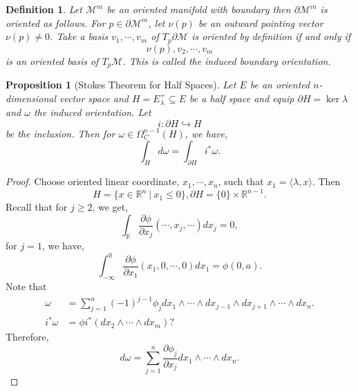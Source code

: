 \documentclass[8pt]{article}
\newtheorem{proposition}{Proposition}[section]
\newtheorem{definition}{Definition}[section]
\newcommand{\R}[0]{\mathbb{R}}
\newcommand{\M}[0]{\mathcal{M}}
\newcommand{\sep}[0]{\:|\:}
\newcommand{\pd}[2]{{\frac {\partial #1} {\partial #2}}}
\begin{document}
\begin{definition}
  Let $\M^m$ be an oriented manifold with boundary then $\partial \M^m$ is oriented as follows. For $p\in\partial \M^m$, let $\nu(p)$ be an outward pointing vector $\nu(p)\not=0$. Take a basis $v_1,\cdots,v_m$ of $T_p\partial\M$ is oriented by definition if and only if 
  \begin{equation*}
    \nu(p),v_2,\cdots,v_m
  \end{equation*}
  is an oriented basis of $T_p\M$. This is called the induced boundary orientation.
\end{definition} 

\begin{proposition}[Stokes Theorem for Half Spaces]
  Let $E$ be an oriented $n$-dimensional vector space and $H = E^+_\lambda\subseteq E$ be a half space and equip $\partial H = \ker\lambda$ and $\omega$ the induced orientation. Let 
  \begin{equation*}
    i:\partial H\hookrightarrow H
  \end{equation*}
  be the inclusion. Then for $\omega\in\Omega_C^{n-1}(H)$, we have,
  \begin{equation*}
    \int_Hd\omega = \int_{\partial H}i^*\omega.
  \end{equation*}
\end{proposition}

\begin{proof}
Choose oriented linear coordinate, $x_1,\cdots,x_n$, such that $x_1 = \langle \lambda,x\rangle$. Then 
\begin{equation*}
  H = \{x\in\R^n\sep x_1\leq 0\}, \partial H=\{0\}\times\R^{n-1}.
\end{equation*}
Recall that for $j\geq 2$, we get,
\begin{equation*}
  \int_\R\pd{\phi}{x_j}(\cdots,x_j,\cdots)dx_j=0,
\end{equation*}
for $j=1$, we have,
\begin{equation*}
  \int_{-\infty}^0\pd{\phi}{x_1}(x_1,0,\cdots,0)dx_1 = \phi(0,a).
\end{equation*}
Note that 
\begin{align*}
  \omega &= \sum_{j=1}^n(-1)^{j-1}\phi_jdx_1\wedge\cdots\wedge dx_{j-1}\wedge dx_{j+1}\wedge\cdots\wedge dx_n.\\
  i^*\omega &= \phi i^*(dx_2\wedge\cdots\wedge dx_m)?
\end{align*}
Therefore,
\begin{equation*}
  d\omega = \sum_{j=1}^n \pd{\phi_j}{x_j}dx_1\wedge\cdots\wedge dx_n.
\end{equation*}
\end{proof}
\end{document}
